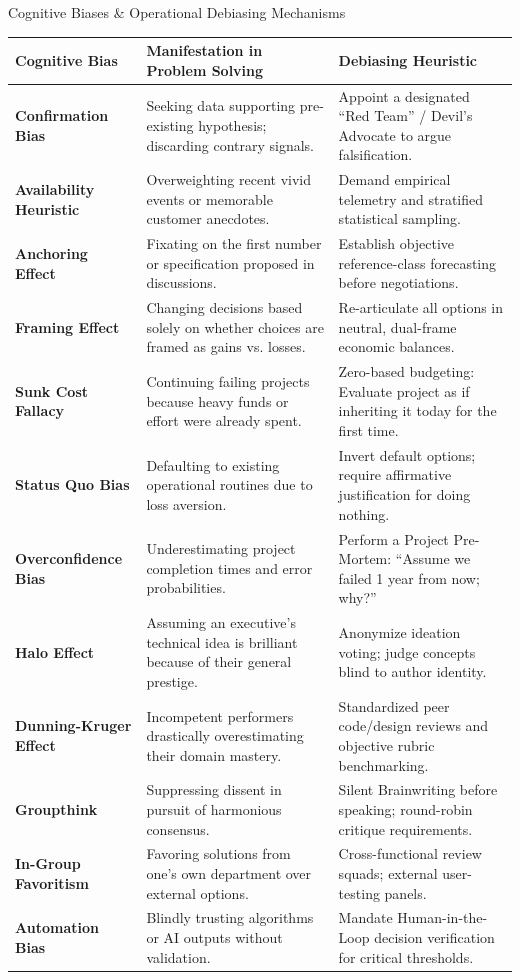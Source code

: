 \begin{frameworkbox}{Cognitive Biases \& Operational Debiasing Mechanisms}
\begin{tabularx}{\linewidth}{|l|X|X|} \hline
\textbf{Cognitive Bias} & \textbf{Manifestation in Problem Solving} & \textbf{Debiasing Heuristic} \\ \hline
\textbf{Confirmation Bias} & Seeking data supporting pre-existing hypothesis; discarding contrary signals. & Appoint a designated ``Red Team'' / Devil's Advocate to argue falsification. \\ \hline
\textbf{Availability Heuristic} & Overweighting recent vivid events or memorable customer anecdotes. & Demand empirical telemetry and stratified statistical sampling. \\ \hline
\textbf{Anchoring Effect} & Fixating on the first number or specification proposed in discussions. & Establish objective reference-class forecasting before negotiations. \\ \hline
\textbf{Framing Effect} & Changing decisions based solely on whether choices are framed as gains vs. losses. & Re-articulate all options in neutral, dual-frame economic balances. \\ \hline
\textbf{Sunk Cost Fallacy} & Continuing failing projects because heavy funds or effort were already spent. & Zero-based budgeting: Evaluate project as if inheriting it today for the first time. \\ \hline
\textbf{Status Quo Bias} & Defaulting to existing operational routines due to loss aversion. & Invert default options; require affirmative justification for doing nothing. \\ \hline
\textbf{Overconfidence Bias} & Underestimating project completion times and error probabilities. & Perform a Project Pre-Mortem: ``Assume we failed 1 year from now; why?'' \\ \hline
\textbf{Halo Effect} & Assuming an executive's technical idea is brilliant because of their general prestige. & Anonymize ideation voting; judge concepts blind to author identity. \\ \hline
\textbf{Dunning-Kruger Effect} & Incompetent performers drastically overestimating their domain mastery. & Standardized peer code/design reviews and objective rubric benchmarking. \\ \hline
\textbf{Groupthink} & Suppressing dissent in pursuit of harmonious consensus. & Silent Brainwriting before speaking; round-robin critique requirements. \\ \hline
\textbf{In-Group Favoritism} & Favoring solutions from one's own department over external options. & Cross-functional review squads; external user-testing panels. \\ \hline
\textbf{Automation Bias} & Blindly trusting algorithms or AI outputs without validation. & Mandate Human-in-the-Loop decision verification for critical thresholds. \\ \hline
\end{tabularx}
\end{frameworkbox}

